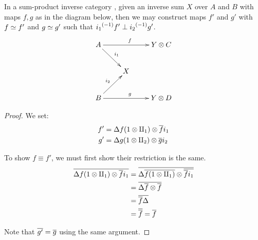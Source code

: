 \begin{lemma}\label{lem:maps_from_inverse_sums_have_disjoint_equivalences}
  In a sum-product inverse category \X, given an inverse sum $X$ over $A$ and $B$ with maps $f, g$
  as in the diagram below, then we may construct maps $f'$ and $g'$ with $f\overset{\scriptscriptstyle }{\simeq}f'$ and
  $g\overset{\scriptscriptstyle }{\simeq}g'$ such that ${i_1}^{(-1)}f' \perp {i_2}^{(-1)}g'$.
  \[
    \xymatrix{
      A \ar[dr]^{i_1} \ar[rr]^f && Y\*C\\
      & X\\
      B \ar[ur]^{i_2} \ar[rr]^g && Y\*D\\
    }
  \]
\end{lemma}
\begin{proof}
  We set:
  \begin{align*}
    f' &= \Delta f(1\otimes\amalg_{1})\otimes \overline{f}i_1\\
    g' &= \Delta g(1\otimes\amalg_{2})\otimes \overline{g}i_2
  \end{align*}

  To show $f\equiv f'$, we must first show their restriction is the same.
  \begin{align*}
    \overline{\Delta f(1\otimes\amalg_{1})\otimes \overline{f}i_1} &= \overline{\Delta \overline{f(1\otimes\amalg_{1})}\otimes \overline{\overline{f}i_1}}\\
    & = \overline{\Delta \overline{f} \otimes \overline{f}}\\
    & = \overline{\overline{f}\Delta}\\
    &= \overline{\overline{f}} = \overline{f}
  \end{align*}

  Note that $\overline{g'} = \overline{g}$ using the same argument.


\end{proof}
